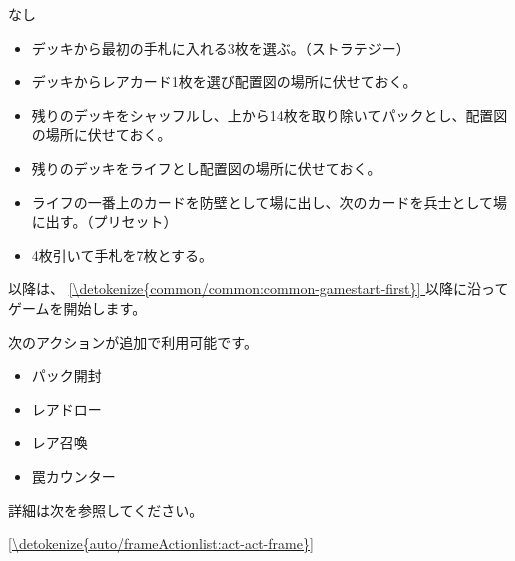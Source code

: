 \documentclass[letterpaper,10pt,dvipdfmx]{sphinxmanual}
\begin{document}
\sphinxAtStartPar
{}

\sphinxAtStartPar
なし

\sphinxAtStartPar
{}
\begin{itemize}
\item {} 
\sphinxAtStartPar
デッキから最初の手札に入れる3枚を選ぶ。（ストラテジー）

\item {} 
\sphinxAtStartPar
デッキからレアカード1枚を選び配置図の場所に伏せておく。

\item {} 
\sphinxAtStartPar
残りのデッキをシャッフルし、上から14枚を取り除いてパックとし、配置図の場所に伏せておく。

\item {} 
\sphinxAtStartPar
残りのデッキをライフとし配置図の場所に伏せておく。

\item {} 
\sphinxAtStartPar
ライフの一番上のカードを防壁として場に出し、次のカードを兵士として場に出す。（プリセット）

\item {} 
\sphinxAtStartPar
4枚引いて手札を7枚とする。

\end{itemize}

\sphinxAtStartPar
以降は、 \hyperref[\detokenize{common/common:common-gamestart-first}]{\ref{\detokenize{common/common:common-gamestart-first}} } 以降に沿ってゲームを開始します。

\sphinxAtStartPar
{}

\sphinxAtStartPar
次のアクションが追加で利用可能です。
\begin{itemize}
\item {} 
\sphinxAtStartPar
パック開封

\item {} 
\sphinxAtStartPar
レアドロー

\item {} 
\sphinxAtStartPar
レア召喚

\item {} 
\sphinxAtStartPar
罠カウンター

\end{itemize}

\sphinxAtStartPar
詳細は次を参照してください。

\sphinxAtStartPar
\hyperref[\detokenize{auto/frameActionlist:act-act-frame}]{\ref{\detokenize{auto/frameActionlist:act-act-frame}} }
\end{document}
